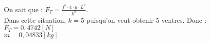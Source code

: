 %
%
    On sait que : \(F_T=\frac{f^2 \cdot 4 \cdot \mu \cdot L^2}{k^2}\). \\
    Dans cette situation, \(k=5\) puisqu'on veut obtenir 5 ventres. Donc :\\
    \(F_T=0,4742[N]\) \\
    \(m=0,04833[kg]\)

